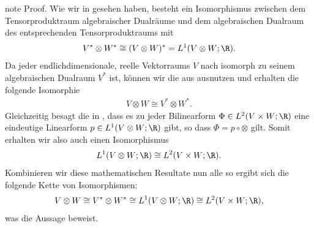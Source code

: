 \documentclass[letterpaper,10pt,german]{jupyterBook}
\begin{document}
\begin{sphinxadmonition}{note}
\sphinxAtStartPar
Proof. Wie wir in {\hyperref[\detokenize{vektoranalysis/tensor:cor:tensorenLinearformen}]{}} gesehen haben, besteht ein Isomorphismus zwischen dem Tensorproduktraum algebraischer Dualräume und dem algebraischen Dualraum des entsprechenden Tensorproduktraums mit
\begin{equation*}
\begin{split}V^\ast \otimes W^\ast \cong (V\otimes W)^\ast = L^1(V \otimes W; \R).\end{split}
\end{equation*}
\sphinxAtStartPar
Da jeder endlich\sphinxhyphen{}dimensionale, reelle Vektorraums \(V\) nach {\hyperref[\detokenize{vektoranalysis/multilinear:lem:dualeBasis}]{}} isomorph zu seinem algebraischen Dualraum \(V^\ast\) ist, können wir die  aus {\hyperref[\detokenize{vektoranalysis/tensor:lem:natISO}]{}} ausnutzen und erhalten die folgende Isomorphie
\begin{equation}\label{equation:vektoranalysis/tensor:eq:transitivIsomorphismus}
\begin{split}V \otimes W \cong V^\ast \otimes W^\ast.\end{split}
\end{equation}
\sphinxAtStartPar
Gleichzeitig besagt die  in , dass es zu jeder Bilinearform \(\Phi \in L^2(V \times W; \R)\) eine eindeutige Linearform \(p \in L^1(V \otimes W; \R)\) gibt, so dass \(\Phi = p \circ \otimes\) gilt.
Somit erhalten wir also auch einen Isomorphismus
\begin{equation*}
\begin{split}L^1(V \otimes W; \R) \cong L^2(V \times W; \R).\end{split}
\end{equation*}
\sphinxAtStartPar
Kombinieren wir diese mathematischen Resultate nun alle so ergibt sich die folgende Kette von Isomorphismen:
\begin{equation*}
\begin{split}V \otimes W \cong V^\ast \otimes W^\ast \cong L^1(V \otimes W; \R) \cong L^2(V \times W; \R),\end{split}
\end{equation*}
\sphinxAtStartPar
was die Aussage beweist.
\end{sphinxadmonition}
\end{document}
